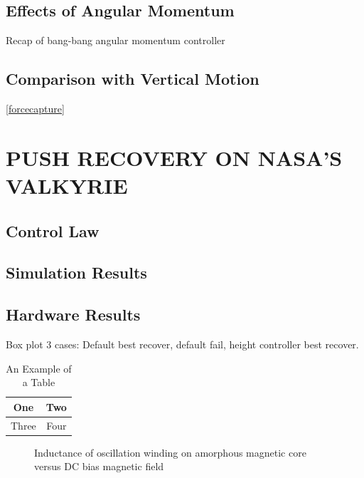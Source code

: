 \documentclass[letterpaper, 10 pt, conference]{ieeeconf}  %
\begin{document}
\subsection{Effects of Angular Momentum}
Recap of \cite{pratt2006capture} bang-bang angular momentum controller
\subsection{Comparison with Vertical Motion}
\ref{forcecapture}
\section{PUSH RECOVERY ON NASA'S VALKYRIE}

\subsection{Control Law}

\subsection{Simulation Results}

\subsection{Hardware Results}
Box plot 3 cases: Default best recover, default fail, height controller best recover.

\begin{table}[h]
\caption{An Example of a Table}
\label{table_example}
\begin{center}
\begin{tabular}{|c||c|}
\hline
One & Two\\
\hline
Three & Four\\
\hline
\end{tabular}
\end{center}
\end{table}


   \begin{figure}[thpb]
      \centering
      \caption{Inductance of oscillation winding on amorphous
       magnetic core versus DC bias magnetic field}
      \label{figurelabel}
   \end{figure}
   
\end{document}
